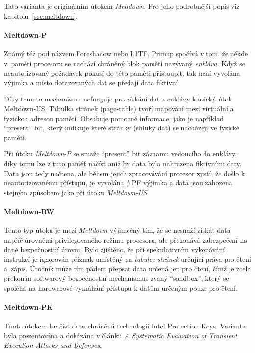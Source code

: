 Tato varianta je originálním útokem \textit{Meltdown}.
Pro jeho podrobnější popis viz kapitolu~\ref{sec:meltdown}.

\paragraph{Meltdown-P}

Známý též pod názvem Foreshadow nebo L1TF.
Princip spočívá v tom, že někde v~paměti procesoru se nachází chráněný blok paměti nazývaný \textit{enkláva}.
Když se neautorizovaný požadavek pokusí do této paměti přistoupit, tak není vyvolána výjimka a místo dotazovaných dat se předají data fiktivní.

Díky tomuto mechanismu nefunguje pro získání dat z enklávy klasický útok Meltdown-US.
Tabulka stránek (page-table) tvoří mapování mezi virtuální a fyzickou adresou paměti.
Obsahuje pomocné informace, jako je například \enquote{present} bit, který indikuje které stránky (shluky dat) se nacházejí ve fyzické paměti.

Při útoku \textit{Meltdown-P} se smaže \enquote{present} bit záznamu vedoucího do enklávy, díky tomu lze z tuto paměť načíst aniž by data byla nahrazena fiktivními daty.
Data jsou tedy načtena, ale během jejich zpracovávání procesor zjistí, že došlo k neautorizovanému přístupu, je vyvolána \#PF výjimka a data jsou zahozena stejným způsobem jako při útoku \textit{Meltdown-US}.

\paragraph{Meltdown-RW}

Tento typ útoku je mezi \textit{Meltdown} výjimečný tím, že se nesnaží získat data napříč úrovněmi privilegovaného režimu procesoru, ale překonává zabezpečení na dané bezpečnostní úrovni.
Bylo zjištěno, že při spekulativním vykonávání instrukcí je ignorován příznak umístěný na \textit{tabulce stránek} určující práva pro čtení a~zápis.
Útočník může tím pádem přepsat data určená jen pro čtení, čímž je zcela překonán softwarový bezpečnostní mechanismus zvaný \enquote{sandbox}, který se spoléhá na hardwarové vymáhání přístupu k datům určeným pouze pro čtení.

\paragraph{Meltdown-PK}

Tímto útokem lze číst data chráněná technologií Intel Protection Keys.
Varianta byla prezentována a dokázána v článku \textit{A Systematic Evaluation of Transient Execution Attacks and Defenses}.

